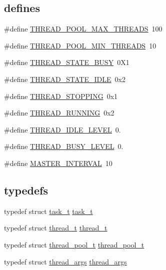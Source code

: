 \subsection*{\textquotesingle{}defines\textquotesingle{}}
\begin{DoxyCompactItemize}
\item 
\#define \hyperlink{G-2313-06-P1__thread__pool_8h_a1d5f9a0a6439db9d27573f4ea768e03a}{T\+H\+R\+E\+A\+D\+\_\+\+P\+O\+O\+L\+\_\+\+M\+A\+X\+\_\+\+T\+H\+R\+E\+A\+DS}~100
\item 
\#define \hyperlink{G-2313-06-P1__thread__pool_8h_a2dddf10750568983fb5e8793f467e170}{T\+H\+R\+E\+A\+D\+\_\+\+P\+O\+O\+L\+\_\+\+M\+I\+N\+\_\+\+T\+H\+R\+E\+A\+DS}~10
\item 
\#define \hyperlink{G-2313-06-P1__thread__pool_8h_a91780ed988c2db43eb70b7106cee217b}{T\+H\+R\+E\+A\+D\+\_\+\+S\+T\+A\+T\+E\+\_\+\+B\+U\+SY}~0\+X1
\item 
\#define \hyperlink{G-2313-06-P1__thread__pool_8h_a7fb00c8fb812a4f9a1c08e22a95104a1}{T\+H\+R\+E\+A\+D\+\_\+\+S\+T\+A\+T\+E\+\_\+\+I\+D\+LE}~0x2
\item 
\#define \hyperlink{G-2313-06-P1__thread__pool_8h_acef14a4788dacf3640cf28745cf49726}{T\+H\+R\+E\+A\+D\+\_\+\+S\+T\+O\+P\+P\+I\+NG}~0x1
\item 
\#define \hyperlink{G-2313-06-P1__thread__pool_8h_a9c22e7eceaed2a27b40b3bd043c1d057}{T\+H\+R\+E\+A\+D\+\_\+\+R\+U\+N\+N\+I\+NG}~0x2
\item 
\#define \hyperlink{G-2313-06-P1__thread__pool_8h_a9466670765f7653fc75437eb55c472f3}{T\+H\+R\+E\+A\+D\+\_\+\+I\+D\+L\+E\+\_\+\+L\+E\+V\+EL}~0.
\item 
\#define \hyperlink{G-2313-06-P1__thread__pool_8h_a09199434ab101700c051a235cf740f30}{T\+H\+R\+E\+A\+D\+\_\+\+B\+U\+S\+Y\+\_\+\+L\+E\+V\+EL}~0.
\item 
\#define \hyperlink{G-2313-06-P1__thread__pool_8h_a562492e441dc328fba8a344c7206758a}{M\+A\+S\+T\+E\+R\+\_\+\+I\+N\+T\+E\+R\+V\+AL}~10
\end{DoxyCompactItemize}
\subsection*{\textquotesingle{}typedefs\textquotesingle{}}
\begin{DoxyCompactItemize}
\item 
typedef struct \hyperlink{structtask__t}{task\+\_\+t} \hyperlink{G-2313-06-P1__thread__pool_8h_a989e278a815d7ada960572a3e9fad896}{task\+\_\+t}
\item 
typedef struct \hyperlink{structthread__t}{thread\+\_\+t} \hyperlink{G-2313-06-P1__thread__pool_8h_a6e84f6599234bedf30a8b88f56e8fd48}{thread\+\_\+t}
\item 
typedef struct \hyperlink{structthread__pool__t}{thread\+\_\+pool\+\_\+t} \hyperlink{G-2313-06-P1__thread__pool_8h_a5f14d1f0d9a94d2e45b01104049529eb}{thread\+\_\+pool\+\_\+t}
\item 
typedef struct \hyperlink{structthread__args}{thread\+\_\+args} \hyperlink{G-2313-06-P1__thread__pool_8h_ae7684b0001f8477707ef97e117e09d31}{thread\+\_\+args}
\end{DoxyCompactItemize}
